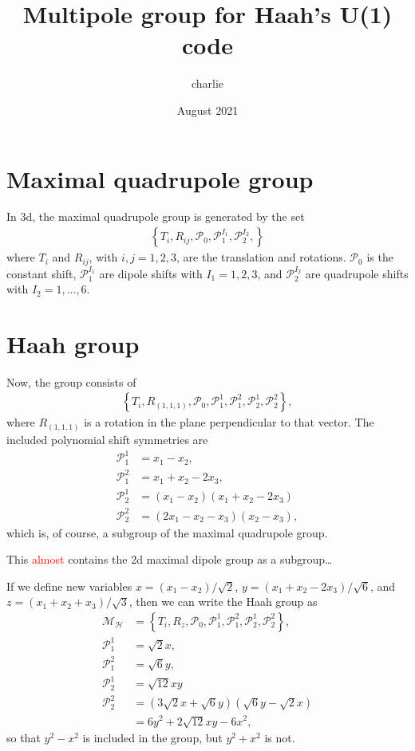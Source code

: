 \documentclass[12pt]{article}
\title{Multipole group for Haah's U(1) code}
\author{charlie}
\date{August 2021}
\newcommand{\note}[1]{\textcolor{red}{#1}}
\renewcommand{\cal}{\mathcal}
\newcommand{\nn}{\nonumber\\}
\begin{document}
\maketitle

\section{Maximal quadrupole group}

In 3d, the maximal quadrupole group is generated by the set
\begin{align}
\left\{T_i, R_{ij}, \cal{P}_0, \cal{P}_1^{I_1}, \cal{P}_2^{I_2},
\right\}
\end{align}
where $T_i$ and $R_{ij}$, with $i,j=1,2,3$, are the translation and rotations. $\cal{P}_0$ is the constant shift, $\cal{P}_1^{I_1}$ are dipole shifts with $I_1=1,2,3$, and $\cal{P}_2^{I_2}$ are quadrupole shifts with $I_2=1,\dots,6$.

\section{Haah group}

Now, the group consists of
\begin{align}
\left\{T_i, R_{(1,1,1)}, \cal{P}_0, \cal{P}_1^1, \cal{P}_1^2, \cal{P}_2^1, \cal{P}_2^2
\right\},
\end{align}
where $R_{(1,1,1)}$ is a rotation in the plane perpendicular to that vector. The included polynomial shift symmetries are 
\begin{align}
\cal{P}_1^1 &= x_1-x_2, \nn
\cal{P}_1^2 &= x_1+ x_2 - 2x_3, \nn
\cal{P}_2^1 &= (x_1 - x_2) (x_1 + x_2 - 2x_3)\nn
\cal{P}_2^2 &= (2x_1 - x_2 - x_3) (x_2 - x_3),
\end{align}
which is, of course, a subgroup of the maximal quadrupole group.

This \note{almost} contains the 2d maximal dipole group as a subgroup\dots

If we define new variables $x = (x_1 - x_2)/\sqrt{2}$, $y = (x_1 + x_2 - 2x_3)/\sqrt{6}$, and $z = (x_1 + x_2 + x_3)/\sqrt{3}$, then we can write the Haah group as 
\begin{align}
\cal{M_H} &= \left\{T_i, R_{z}, \cal{P}_0, \cal{P}_1^1, \cal{P}_1^2, \cal{P}_2^1, \cal{P}_2^2
\right\},\nn
\cal{P}_1^1 &= \sqrt{2} x , \nn
\cal{P}_1^2 &= \sqrt{6} y, \nn
\cal{P}_2^1 &= \sqrt{12} xy\nn
\cal{P}_2^2 &= (3\sqrt{2} x + \sqrt{6} y) (\sqrt{6} y - \sqrt{2} x)\nn
&= 6y^2 +2\sqrt{12} xy - 6x^2,
\end{align}
so that $y^2-x^2$ is included in the group, but $y^2+x^2$ is not. 

% 
% 
\end{document}
